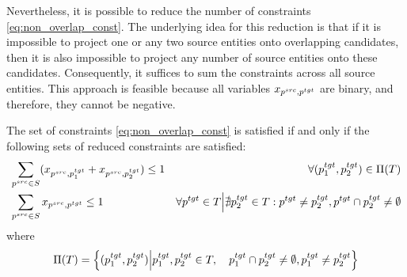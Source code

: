 Nevertheless, it is possible to reduce the number of constraints
\eqref{eq:non_overlap_const}. The underlying idea for this reduction is that
if it is impossible to project one or any two source entities onto overlapping
candidates, then it is also impossible to project any number of source entities
onto these candidates. Consequently, it suffices to sum the constraints across
all source entities. This approach is feasible because all variables
\( x_{p^{src}, p^{tgt}} \) are binary, and therefore, they cannot be
negative.
\begin{theorem}
  The set of constraints \eqref{eq:non_overlap_const} is satisfied if and only if
  the following sets of reduced constraints are satisfied:
  \begin{align*}
    & \sum\limits_{p^{src} \in S} (x_{p^{src}, p_1^{tgt}} + x_{p^{src}, p_2^{tgt}}) \leq 1                                & \forall (p_1^{tgt}, p_2^{tgt}) \in \Pi(T) \\
    & \sum\limits_{p^{src} \in S} x_{p^{src}, p^{tgt}} \leq 1
    & \forall p^{tgt} \in T \Big| \nexists p_2^{tgt} \in T: p^{tgt} \neq p_2^{tgt}, p^{tgt} \cap p_2^{tgt} \neq \emptyset                                             \\
  \end{align*}
  where
  \begin{equation*}
    \Pi(T) = \left\{ (p_1^{tgt}, p_2^{tgt}) \Big| p_1^{tgt}, p_2^{tgt} \in T,
      \quad p_1^{tgt} \cap p_2^{tgt} \neq \emptyset,
    p_1^{tgt} \neq p_2^{tgt} \right\}
  \end{equation*}
\end{theorem}
